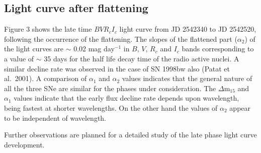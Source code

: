 \subsection{Light curve after flattening}

Figure 3 shows the late time $BVR_cI_c$ light curve from JD 2542340 to 
JD 2542520, following the occurrence of the flattening.
The slopes of the flattened part ($\alpha_2$) of the light curves are 
$\sim$ 0.02 mag day$^{-1}$ in $B$, $V$, $R_c$ and $I_c$ bands corresponding to a value 
of $\sim$ 35 days for the half life decay time of the radio active nuclei. 
A similar decline rate was observed in the case of SN 1998bw also (Patat et al.\ 2001).
A comparison of $\alpha_1$ and $\alpha_2$ values indicates that the general
nature of all the three SNe are similar for the phases under consideration.  
The $\Delta$m$_{15}$ and $\alpha_1$ values indicate that the early flux decline rate
 depends upon wavelength, being fastest at shorter wavelengths. On the other hand 
the values of $\alpha_2$ appear to be independent of wavelength. 

Further observations are planned for a detailed study of the late phase light curve development.

